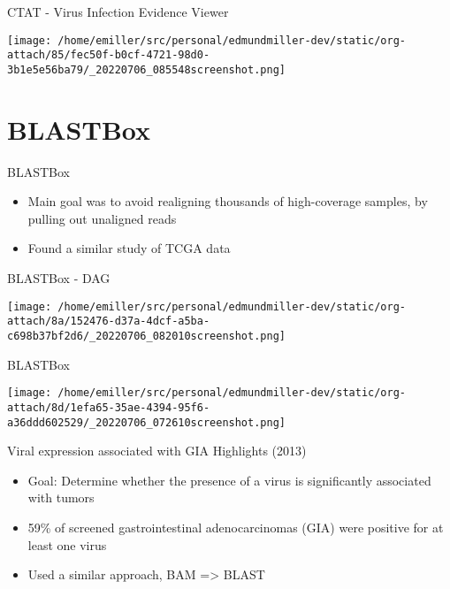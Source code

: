 \documentclass[bigger]{beamer}
\begin{document}
\begin{frame}[label={sec:org7e319a3}]{CTAT - Virus Infection Evidence Viewer}
\begin{center}
\texttt{[image: /home/emiller/src/personal/edmundmiller-dev/static/org-attach/85/fec50f-b0cf-4721-98d0-3b1e5e56ba79/\_20220706\_085548screenshot.png]}
\end{center}
\end{frame}


\section*{BLASTBox}
\label{sec:org7cfcf46}

\begin{frame}[label={sec:orgd0c6e09}]{BLASTBox}
\begin{itemize}
\item Main goal was to \alert{avoid realigning} thousands of high-coverage samples, by
pulling out unaligned reads
\item Found a similar study of TCGA data
\end{itemize}
\end{frame}

\begin{frame}[label={sec:org12c077d}]{BLASTBox - DAG}
\begin{center}
\texttt{[image: /home/emiller/src/personal/edmundmiller-dev/static/org-attach/8a/152476-d37a-4dcf-a5ba-c698b37bf2d6/\_20220706\_082010screenshot.png]}
\end{center}
\end{frame}

\begin{frame}[label={sec:orgd29fa71}]{BLASTBox}
\begin{center}
\texttt{[image: /home/emiller/src/personal/edmundmiller-dev/static/org-attach/8d/1efa65-35ae-4394-95f6-a36ddd602529/\_20220706\_072610screenshot.png]}
\end{center}
\end{frame}

\begin{frame}[label={sec:org6e1bdd1}]{Viral expression associated with GIA Highlights (2013)}
\begin{itemize}
\item Goal: Determine whether the presence of a virus is significantly associated
with tumors
\item 59\% of screened gastrointestinal adenocarcinomas (GIA) were positive for at
least one virus
\item Used a similar approach, BAM => BLAST
\end{itemize}
\end{frame}
\end{document}
